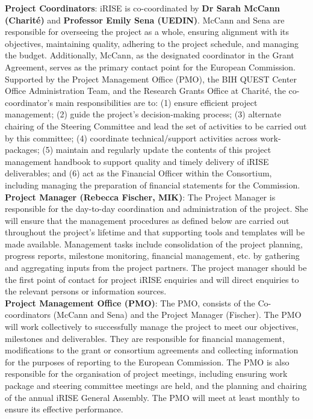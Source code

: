 \documentclass[
]{article}
\begin{document}
\textbf{Project Coordinators}: iRISE is co-coordinated by \textbf{Dr Sarah McCann
(Charité)} and \textbf{Professor Emily Sena (UEDIN)}. McCann and Sena are
responsible for overseeing the project as a whole, ensuring alignment
with its objectives, maintaining quality, adhering to the project
schedule, and managing the budget. Additionally, McCann, as the
designated coordinator in the Grant Agreement, serves as the primary
contact point for the European Commission.\\
Supported by the Project Management Office (PMO), the BIH QUEST Center
Office Administration Team, and the Research Grants Office at Charité,
the co-coordinator's main responsibilities are to: (1) ensure efficient
project management; (2) guide the project's decision-making process; (3)
alternate chairing of the Steering Committee and lead the set of
activities to be carried out by this committee; (4) coordinate
technical/support activities across work-packages; (5) maintain and
regularly update the contents of this project management handbook to
support quality and timely delivery of iRISE deliverables; and (6) act
as the Financial Officer within the Consortium, including managing the
preparation of financial statements for the Commission.\\

\textbf{Project Manager (Rebecca Fischer, MIK)}: The Project Manager is
responsible for the day-to-day coordination and administration of the
project. She will ensure that the management procedures as defined below
are carried out throughout the project's lifetime and that supporting
tools and templates will be made available. Management tasks include
consolidation of the project planning, progress reports, milestone
monitoring, financial management, etc. by gathering and aggregating
inputs from the project partners. The project manager should be the
first point of contact for project iRISE enquiries and will direct
enquiries to the relevant persons or information sources.\\

\textbf{Project Management Office (PMO)}: The PMO, consists of the
Co-coordinators (McCann and Sena) and the Project Manager (Fischer). The
PMO will work collectively to successfully manage the project to meet
our objectives, milestones and deliverables. They are responsible for
financial management, modifications to the grant or consortium
agreements and collecting information for the purposes of reporting to
the European Commission. The PMO is also responsible for the
organisation of project meetings, including ensuring work package and
steering committee meetings are held, and the planning and chairing of
the annual iRISE General Assembly. The PMO will meet at least monthly to
ensure its effective performance.\\
\end{document}
